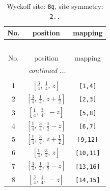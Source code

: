 \documentclass[fleqn,8pt]{jsarticle}
\begin{document}
\renewcommand{\arraystretch}{1.2}
\begin{longtable}{ccc}
\caption{Wyckoff site: {\tt 8g}, site symmetry: {\tt 2..}}
 \\
 \hline \hline
No. & position & mapping \\ \hline \endfirsthead

\multicolumn{2}{l}{\tablename\ \thetable{}} \\
 \hline \hline
No. & position & mapping \\ \hline \endhead

 \hline \hline
\multicolumn{2}{r}{\footnotesize\it continued ...} \\ \endfoot

 \hline \hline
\multicolumn{2}{r}{} \\ \endlastfoot

1 & $\left[ \frac{3}{4},\, \frac{1}{4},\, z \right]$ & {\tt [1,4]} \\ \hline
2 & $\left[ \frac{3}{4},\, \frac{1}{4},\, z + \frac{1}{2} \right]$ & {\tt [2,3]} \\ \hline
3 & $\left[ \frac{1}{4},\, \frac{3}{4},\, - z \right]$ & {\tt [5,8]} \\ \hline
4 & $\left[ \frac{1}{4},\, \frac{3}{4},\, \frac{1}{2} - z \right]$ & {\tt [6,7]} \\ \hline
5 & $\left[ \frac{1}{4},\, \frac{3}{4},\, z + \frac{1}{2} \right]$ & {\tt [9,12]} \\ \hline
6 & $\left[ \frac{1}{4},\, \frac{3}{4},\, z \right]$ & {\tt [10,11]} \\ \hline
7 & $\left[ \frac{3}{4},\, \frac{1}{4},\, \frac{1}{2} - z \right]$ & {\tt [13,16]} \\ \hline
8 & $\left[ \frac{3}{4},\, \frac{1}{4},\, - z \right]$ & {\tt [14,15]} \\
\end{longtable}
\renewcommand{\arraystretch}{1.2}
\end{document}
